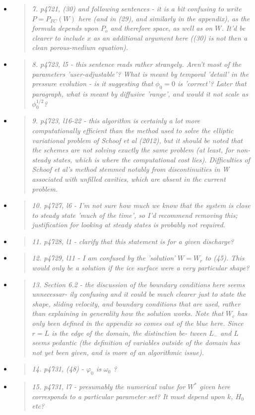 \documentclass[11pt,reqno]{amsart}
\newcommand{\reply}[2]{
\medskip\medskip
\item  \begin{quote}
\emph{#1}
\end{quote}

\medskip
\noindent #2}
\begin{document}
\begin{itemize}
\reply{7. p4721, (30) and following sentences - it is a bit confusing to write $P = P_{FC}(W)$
here (and in (29), and similarly in the appendix), as the formula depends upon $P_o$
and therefore space, as well as on $W$. It’d be clearer to include $x$ as an additional
argument here ((30) is not then a clean porous-medium equation).}
{}

\reply{8. p4723, l5 - this sentence reads rather strangely.  Aren't most of the parameters 'user-adjustable'?  What is meant by temporal 'detail' in the pressure evolution - is it suggesting that $\phi_0=0$ is 'correct'?  Later that paragraph, what is meant by diffusive 'range', and would it not scale as $\phi_0^{1/2}$?}
{}

\reply{9. p4723, l16-22 - this algorithm is certainly a lot more computationally efficient
than the method used to solve the elliptic variational problem of Schoof et al
(2012), but it should be noted that the schemes are not solving exactly the same
problem (at least, for non-steady states, which is where the computational cost
lies).  Difficulties of Schoof et al’s method stemmed notably from discontinuities
in W associated with unfilled cavities, which are absent in the current problem.}
{}

\reply{10. p4727, l6 - I'm not sure how much we know that the system is close to steady
state 'much of the time', so I'd recommend removing this; justification for looking
at steady states is probably not required.}
{}

\reply{11. p4728, l1 - clarify that this statement is for a given discharge?}
{}

\reply{12. p4729, l11 - I am confused by the 'solution' $W = W_r$ to (45). This would only be
a solution if the ice surface were a very particular shape?}
{}

\reply{13. Section 6.2 - the discussion of the boundary conditions here seems unnecessar-
ily confusing and it could be much clearer just to state the shape, sliding velocity,
and boundary conditions that are used, rather than explaining in generality how
the solution works. Note that $W_c$ has only been defined in the appendix so comes
out of the blue here. Since $r = L$ is the edge of the domain, the distinction be-
tween $L_-$ and $L$ seems pedantic (the definition of variables outside of the domain
has not yet been given, and is more of an algorithmic issue).}
{}

\reply{14. p4731, (48) - $\varphi_0$ is $\omega_0$ ?}
{}

\reply{15. p4731, l7 - presumably the numerical value for $W^*$ given here corresponds to a
particular parameter set? It must depend upon $k$, $H_0$ etc?}
{}


\end{itemize}
\end{document}
